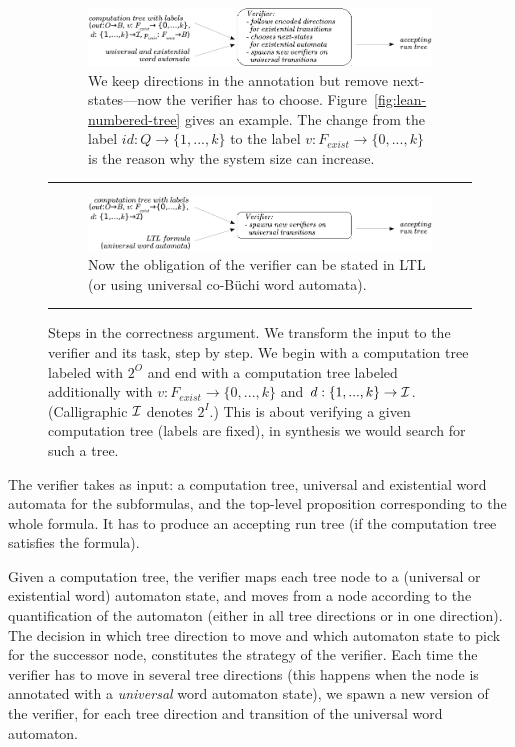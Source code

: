 \begin{figure}[tbp]
%
\begin{subfigure}{\linewidth}\center
\includegraphics[width=\textwidth]{figures/stepD.pdf}
\caption{We keep directions in the annotation but remove next-states---now the verifier has to choose.
  Figure~\ref{fig:lean-numbered-tree} gives an example.
  The change
  from the label $id: Q \to \{1,...,k\}$
  to the label $v:F_\textit{exist} \to \{0,...,k\}$
  is the reason why the system size can increase.}
\label{fig:stepD}
\end{subfigure}
\vspace{0.1cm}
\hrule
\vspace{0.2cm}
%
\begin{subfigure}{\linewidth}\center
\includegraphics[width=\textwidth]{figures/stepE.pdf}
\caption{Now the obligation of the verifier can be stated in LTL (or using universal co-B\"uchi word automata).}
\label{fig:stepE}
\end{subfigure}
\vspace{0.1cm}
\hrule
\vspace{0.2cm}
%
\caption{Steps in the correctness argument.
  We transform the input to the verifier and its task, step by step.
  We begin with a computation tree labeled with $2^O$
  and end with a computation tree labeled additionally with $v: F_{exist} \to \{0,...,k\}$ and $d:\{1,...,k\} \to \cal I$.
  (Calligraphic $\cal I$ denotes $2^I$.)
  This is about verifying a given computation tree (labels are fixed),
  in synthesis we would search for such a tree.}
\label{fig:discussion-summary}
\end{figure}

The verifier takes as input:
a computation tree,
universal and existential word automata for the \CTLstar subformulas, and
the top-level proposition corresponding to the whole \CTLstar formula.
It has to produce an accepting run tree
(if the computation tree satisfies the formula).

Given a computation tree,
the verifier maps each tree node to a (universal or existential word) automaton state,
and moves from a node according to the quantification of the automaton
(either in all tree directions or in one direction).
The decision
in which tree direction to move and which automaton state to pick for the successor node,
constitutes the strategy of the verifier.
Each time the verifier has to move in several tree directions
(this happens when the node is annotated with a \emph{universal} word automaton state),
we spawn a new version of the verifier,
for each tree direction and transition of the universal word automaton.

